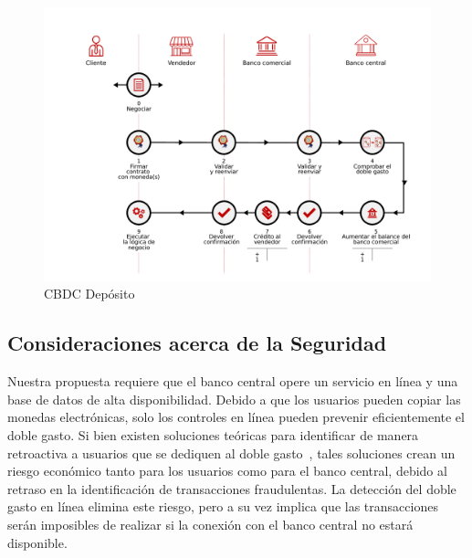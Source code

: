 \documentclass[10pt,spanish]{article}
\begin{document}
\begin{figure}[h!]
  \includegraphics[width=\textwidth]{deposito.pdf}
  \caption{CBDC Depósito}
  \label{fig:fig2}
\end{figure}

\hypertarget{consideraciones-acerca-de-la-seguridad}{%
\subsection{Consideraciones acerca de la Seguridad}
\label{consideraciones-acerca-de-la-seguridad}}

Nuestra propuesta requiere que el banco central opere un servicio en
línea y una base de datos de alta disponibilidad. Debido a que los
usuarios pueden copiar las monedas electrónicas, solo los controles en
línea pueden prevenir eficientemente el doble gasto. Si bien existen
soluciones teóricas para identificar de manera retroactiva a usuarios
que se dediquen al doble gasto~\cite[véase][]{Chaum1990}, tales
soluciones crean un riesgo económico tanto para los usuarios como para
el banco central, debido al retraso en la identificación de
transacciones fraudulentas. La detección del doble gasto en línea
elimina este riesgo, pero a su vez implica que las transacciones serán
imposibles de realizar si la conexión con el banco central no estará
disponible.
\end{document}
